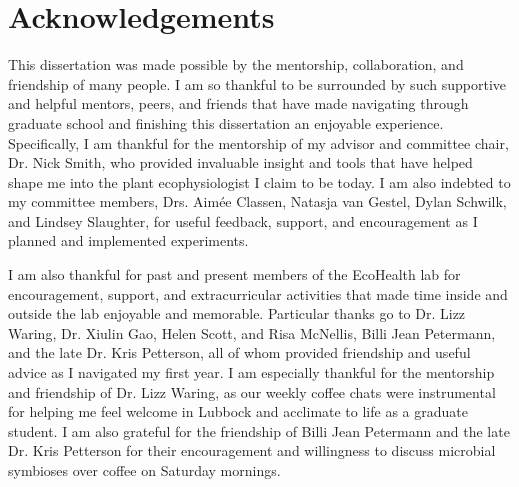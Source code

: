 \documentclass{ttuthes2007}
\begin{document}

\frontmatter

\chapter{\textbf{Acknowledgements}}
\noindent This dissertation was made possible by the mentorship, collaboration, and friendship of many people. I am so thankful to be surrounded by such supportive and helpful mentors, peers, and friends that have made navigating through graduate school and finishing this dissertation an enjoyable experience. Specifically, I am thankful for the  mentorship of my advisor and committee chair, Dr. Nick Smith, who provided invaluable insight and tools that have helped shape me into the plant ecophysiologist I claim to be today. I am also indebted to my committee members, Drs. Aimée Classen, Natasja van Gestel, Dylan Schwilk, and Lindsey Slaughter, for useful feedback, support, and encouragement as I planned and implemented experiments.

I am also thankful for past and present members of the EcoHealth lab for encouragement, support, and extracurricular activities that made time inside and outside the lab enjoyable and memorable. Particular thanks go to Dr. Lizz Waring, Dr. Xiulin Gao, Helen Scott, and Risa McNellis, Billi Jean Petermann, and the late Dr. Kris Petterson, all of whom provided friendship and useful advice as I navigated my first year. I am especially thankful for the mentorship and friendship of Dr. Lizz Waring, as our weekly coffee chats were instrumental for helping me feel welcome in Lubbock and acclimate to life as a graduate student. I am also grateful for the friendship of Billi Jean Petermann and the late Dr. Kris Petterson for their encouragement and willingness to discuss microbial symbioses over coffee on Saturday mornings.
\end{document}
